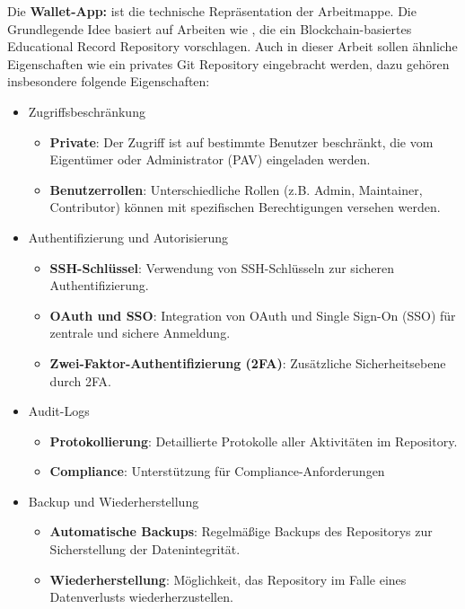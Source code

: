 \documentclass[conference]{IEEEtran}
\begin{document}
Die \textbf{Wallet-App:} ist die technische Repräsentation der Arbeitmappe. Die Grundlegende Idee basiert auf Arbeiten wie \cite{Idee}, die ein Blockchain-basiertes Educational Record Repository vorschlagen. Auch in dieser Arbeit sollen ähnliche Eigenschaften wie ein privates Git Repository eingebracht werden, dazu gehören insbesondere folgende Eigenschaften: 
\begin{itemize}
     \item Zugriffsbeschränkung
    \begin{itemize}
     \item \textbf{Private}: Der Zugriff ist auf bestimmte Benutzer beschränkt, die vom Eigentümer oder Administrator (PAV) eingeladen werden.
     \item \textbf{Benutzerrollen}: Unterschiedliche Rollen (z.B. Admin, Maintainer, Contributor) können mit spezifischen Berechtigungen versehen werden.
    \end{itemize}

    \item Authentifizierung und Autorisierung
    \begin{itemize}
     \item \textbf{SSH-Schlüssel}: Verwendung von SSH-Schlüsseln zur sicheren Authentifizierung.
     \item \textbf{OAuth und SSO}: Integration von OAuth und Single Sign-On (SSO) für zentrale und sichere Anmeldung.
     \item \textbf{Zwei-Faktor-Authentifizierung (2FA)}: Zusätzliche Sicherheitsebene durch 2FA.
    \end{itemize}

    \item Audit-Logs
    \begin{itemize}
     \item \textbf{Protokollierung}: Detaillierte Protokolle aller Aktivitäten im Repository.
     \item \textbf{Compliance}: Unterstützung für Compliance-Anforderungen 
    \end{itemize}

    \item Backup und Wiederherstellung
    \begin{itemize}
     \item \textbf{Automatische Backups}: Regelmäßige Backups des Repositorys zur Sicherstellung der Datenintegrität.
     \item \textbf{Wiederherstellung}: Möglichkeit, das Repository im Falle eines Datenverlusts wiederherzustellen.
    \end{itemize}


\end{itemize}
\end{document}
